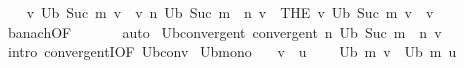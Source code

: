 \begin{isabellebody}
\ \ \isamarkupfalse%
\ {\isachardoublequoteopen}{\isasymexists}{\isacharbang}{\kern0pt}v{\isachardot}{\kern0pt}\ U\isactrlsub b\ {\isacharparenleft}{\kern0pt}Suc\ m{\isacharparenright}{\kern0pt}\ v\ {\isacharequal}{\kern0pt}\ v{\isachardoublequoteclose}\ {\isachardoublequoteopen}{\isacharparenleft}{\kern0pt}{\isasymlambda}n{\isachardot}{\kern0pt}\ {\isacharparenleft}{\kern0pt}U\isactrlsub b\ {\isacharparenleft}{\kern0pt}Suc\ m{\isacharparenright}{\kern0pt}\ {\isacharcircum}{\kern0pt}{\isacharcircum}{\kern0pt}\ n{\isacharparenright}{\kern0pt}\ v{\isacharparenright}{\kern0pt}\ {\isasymlonglonglongrightarrow}\ {\isacharparenleft}{\kern0pt}THE\ v{\isachardot}{\kern0pt}\ U\isactrlsub b\ {\isacharparenleft}{\kern0pt}Suc\ m{\isacharparenright}{\kern0pt}\ v\ {\isacharequal}{\kern0pt}\ v{\isacharparenright}{\kern0pt}{\isachardoublequoteclose}\isanewline
\ \ \ \ \isamarkupfalse%
\ banach{\isacharprime}{\kern0pt}{\isacharbrackleft}{\kern0pt}OF\ {\isacharasterisk}{\kern0pt}{\isacharbrackright}{\kern0pt}\isanewline
\ \ \ \ \isamarkupfalse%
\ auto\isanewline
{}\isamarkupfalse%
%
\endisatagproof
{\isafoldproof}%
%
\isadelimproof
\isanewline
%
\endisadelimproof
\isanewline
{}\isamarkupfalse%
\ U\isactrlsub b{\isacharunderscore}{\kern0pt}convergent{\isacharcolon}{\kern0pt}\ {\isachardoublequoteopen}convergent\ {\isacharparenleft}{\kern0pt}{\isasymlambda}n{\isachardot}{\kern0pt}\ {\isacharparenleft}{\kern0pt}U\isactrlsub b\ {\isacharparenleft}{\kern0pt}Suc\ m{\isacharparenright}{\kern0pt}\ {\isacharcircum}{\kern0pt}{\isacharcircum}{\kern0pt}\ n{\isacharparenright}{\kern0pt}\ v{\isacharparenright}{\kern0pt}{\isachardoublequoteclose}\isanewline
%
\isadelimproof
\ \ %
\endisadelimproof
%
\isatagproof
{}\isamarkupfalse%
\ {\isacharparenleft}{\kern0pt}intro\ convergentI{\isacharbrackleft}{\kern0pt}OF\ U\isactrlsub b{\isacharunderscore}{\kern0pt}conv{\isacharparenleft}{\kern0pt}{}{\isacharparenright}{\kern0pt}{\isacharbrackright}{\kern0pt}{\isacharparenright}{\kern0pt}%
\endisatagproof
{\isafoldproof}%
%
\isadelimproof
\isanewline
%
\endisadelimproof
\isanewline
{}\isamarkupfalse%
\ U\isactrlsub b{\isacharunderscore}{\kern0pt}mono{\isacharcolon}{\kern0pt}\isanewline
\ \ \ {\isachardoublequoteopen}v\ {\isasymle}\ u{\isachardoublequoteclose}\ \isanewline
\ \ \ {\isachardoublequoteopen}U\isactrlsub b\ m\ v\ {\isasymle}\ U\isactrlsub b\ m\ u{\isachardoublequoteclose}\isanewline
%
\isadelimproof
%
\endisadelimproof
%
\isatagproof

\end{isabellebody}
